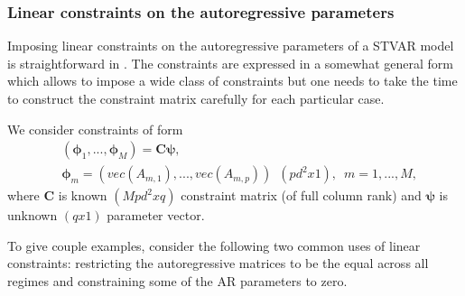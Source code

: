 \documentclass[nojss]{jss}
\begin{document}
\subsubsection{Linear constraints on the autoregressive parameters}
Imposing linear constraints on the autoregressive parameters of a STVAR model is straightforward in . The constraints are expressed in a somewhat general form which allows to impose a wide class of constraints but one needs to take the time to construct the constraint matrix carefully for each particular case.

We consider constraints of form
\begin{align}
& (\boldsymbol{\phi}_1,...,\boldsymbol{\phi}_M) = \boldsymbol{C}\boldsymbol{\psi},\\
& \boldsymbol{\phi}_m=(vec(A_{m,1}),...,vec(A_{m,p}))\enspace (pd^2x1), \enspace m=1,...,M,
\end{align}
where $\boldsymbol{C}$ is known $(Mpd^2xq)$ constraint matrix (of full column rank) and $\boldsymbol{\psi}$ is unknown $(qx1)$ parameter vector.

To give couple examples, consider the following two common uses of linear constraints: restricting the autoregressive matrices to be the equal across all regimes and constraining some of the AR parameters to zero.
\end{document}
